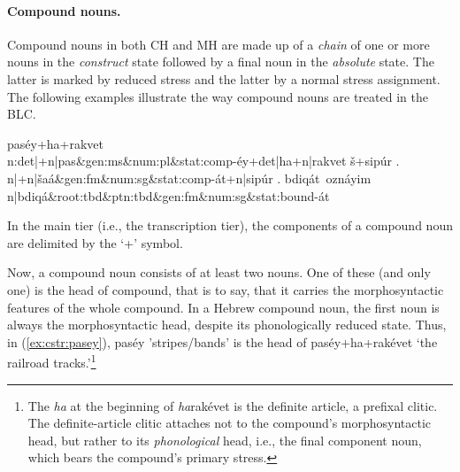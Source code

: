 \paragraph{Compound nouns.}
Compound nouns in both CH and MH are made up of a \emph{chain} of 
one or more nouns in the \emph{construct} state followed by a final noun
in the \emph{absolute} state. The latter is marked by reduced stress 
and the latter by a normal stress assignment. The following examples 
illustrate the way compound nouns are treated in the BLC.
\begin{exe}
\ex \label{ex:cstr:pasey}
	\textsf{pas\'{e}y+ha+rakvet} \\
	\textsf{n:det|+n|pas\&gen:ms\&num:pl\&stat:comp-\'{e}y+det|ha+n|rakvet}
\ex \label{ex:cstr:shaat} 
	\textsf{\v{s}+sip\'{u}r .} \\
	\textsf{n|+n|\v{s}a\'a\&gen:fm\&num:sg\&stat:comp-\'at+n|sip\'ur .}
\ex \label{ex:cstr:bdiqat} 
	\textsf{bdiq\'{a}t\, ozn\'{a}yim} \\ 
	\textsf{n|bdiq\'{a}\&root:tbd\&ptn:tbd\&gen:fm\&num:sg\&stat:bound-\'{a}t}
\end{exe}
In the main tier (i.e., the transcription tier), the components of a compound noun are
delimited by the `+' symbol. 

Now, a compound noun consists of at least two nouns. One of these 
(and only one) is the head of compound, that is to say, that it carries the morphosyntactic 
features of the whole compound.
In a Hebrew compound noun, the first noun
is always the morphosyntactic head, despite its phonologically reduced state.
Thus, in (\ref{ex:cstr:pasey}), \textsf{pas\'{e}y} 'stripes/bands' is the head of 
\textsf{pas\'{e}y+ha+rak\'{e}vet} `the railroad tracks.'\footnote{The \textit{ha} at the beginning of  
\textsf{\textit{ha}rak\'{e}vet} 
is the definite article, a prefixal clitic. The definite-article clitic attaches not 
to the compound's morphosyntactic head, but rather to its \emph{phonological} 
head, i.e., the final component noun, which bears the compound's primary stress.}



